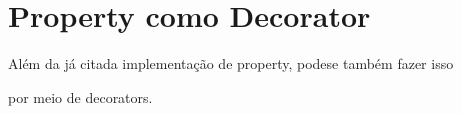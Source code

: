 \documentclass[letterpaper,10pt,brazil]{sphinxmanual}
\begin{document}
\begin{sphinxVerbatim}[commandchars=\\\{\}]
\end{sphinxVerbatim}

\begin{sphinxVerbatim}[commandchars=\\\{\}]
\end{sphinxVerbatim}

\begin{sphinxVerbatim}[commandchars=\\\{\}]
\end{sphinxVerbatim}


\section{Property como Decorator}
\label{\detokenize{content/property:property-como-decorator}}
\begin{DUlineblock}{0em}
\item[]
\begin{DUlineblock}{\DUlineblockindent}
\item[] Além da já citada implementação de property, pode\sphinxhyphen{}se também fazer isso
\end{DUlineblock}
\item[] por meio de decorators.
\end{DUlineblock}
\end{document}
